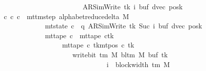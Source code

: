 \begin{isabellebody}
\ \ \ \ \ \ \ \ \ \ \ \ \ \ \ \ \ \ \ \ \ \ \ \ \ \ {\isacharparenleft}{\kern0pt}AR{\isacharunderscore}{\kern0pt}SimWrite{\isacharcomma}{\kern0pt}\ tk{\isacharcomma}{\kern0pt}\ i{\isacharcomma}{\kern0pt}\ buf{\isacharcomma}{\kern0pt}\ dvec{\isacharcomma}{\kern0pt}\ posk{\isacharparenright}{\kern0pt}{\isachardoublequoteclose}\isanewline
\ \ \ {\isachardoublequoteopen}{\isasymexists}c{\isacharprime}{\kern0pt}{\isacharprime}{\kern0pt}{\isachardot}{\kern0pt}\ {\isacharparenleft}{\kern0pt}c{\isacharprime}{\kern0pt}{\isacharcomma}{\kern0pt}\ c{\isacharprime}{\kern0pt}{\isacharprime}{\kern0pt}{\isacharparenright}{\kern0pt}\ {\isasymin}\ mttm{\isacharunderscore}{\kern0pt}step\ {\isacharparenleft}{\kern0pt}alphabet{\isacharunderscore}{\kern0pt}reduce{\isacharunderscore}{\kern0pt}delta\ M{\isacharparenright}{\kern0pt}\isanewline
\ \ \ \ \ \ \ \ \ \ \ \ \ \ {\isasymand}\ mt{\isacharunderscore}{\kern0pt}state\ c{\isacharprime}{\kern0pt}{\isacharprime}{\kern0pt}\ {\isacharequal}{\kern0pt}\ {\isacharparenleft}{\kern0pt}q{\isacharcomma}{\kern0pt}\ AR{\isacharunderscore}{\kern0pt}SimWrite{\isacharcomma}{\kern0pt}\ tk{\isacharcomma}{\kern0pt}\ Suc\ i{\isacharcomma}{\kern0pt}\ buf{\isacharcomma}{\kern0pt}\ dvec{\isacharcomma}{\kern0pt}\ posk{\isacharparenright}{\kern0pt}\isanewline
\ \ \ \ \ \ \ \ \ \ \ \ \ \ {\isasymand}\ mt{\isacharunderscore}{\kern0pt}tape\ c{\isacharprime}{\kern0pt}{\isacharprime}{\kern0pt}\ {\isacharequal}{\kern0pt}\ {\isacharparenleft}{\kern0pt}mt{\isacharunderscore}{\kern0pt}tape\ c{\isacharprime}{\kern0pt}{\isacharparenright}{\kern0pt}{\isacharparenleft}{\kern0pt}tk\ {\isacharcolon}{\kern0pt}{\isacharequal}{\kern0pt}\isanewline
\ \ \ \ \ \ \ \ \ \ \ \ \ \ \ \ \ \ \ \ {\isacharparenleft}{\kern0pt}mt{\isacharunderscore}{\kern0pt}tape\ c{\isacharprime}{\kern0pt}\ tk{\isacharparenright}{\kern0pt}{\isacharparenleft}{\kern0pt}mt{\isacharunderscore}{\kern0pt}pos\ c{\isacharprime}{\kern0pt}\ tk\ {\isacharcolon}{\kern0pt}{\isacharequal}{\kern0pt}\isanewline
\ \ \ \ \ \ \ \ \ \ \ \ \ \ \ \ \ \ \ \ \ \ \ write{\isacharunderscore}{\kern0pt}bit\ {\isacharparenleft}{\kern0pt}{\isasymGamma}{\isacharunderscore}{\kern0pt}tm\ M{\isacharparenright}{\kern0pt}\ {\isacharparenleft}{\kern0pt}bl{\isacharunderscore}{\kern0pt}tm\ M{\isacharparenright}{\kern0pt}\ {\isacharparenleft}{\kern0pt}buf\ tk{\isacharparenright}{\kern0pt}\isanewline
\ \ \ \ \ \ \ \ \ \ \ \ \ \ \ \ \ \ \ \ \ \ \ \ \ \ \ \ \ \ \ \ \ {\isacharparenleft}{\kern0pt}i\ {\isacharminus}{\kern0pt}\ block{\isacharunderscore}{\kern0pt}width\ {\isacharparenleft}{\kern0pt}{\isasymGamma}{\isacharunderscore}{\kern0pt}tm\ M{\isacharparenright}{\kern0pt}{\isacharparenright}{\kern0pt}{\isacharparenright}{\kern0pt}{\isacharparenright}{\kern0pt}\isanewline

\end{isabellebody}
